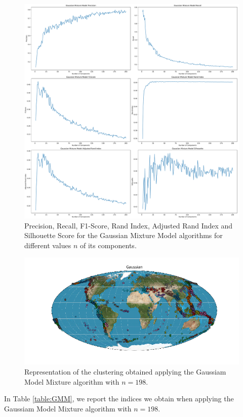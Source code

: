 \documentclass[a4paper]{article}
\begin{document}
 	\begin{figure}[H]
 		\includegraphics[width=\linewidth]{gmm_indeces.pdf}
 		\caption{Precision, Recall, F1-Score, Rand Index, Adjusted Rand Index and Silhouette Score for the Gaussian Mixture Model algorithms for different values $n$ of its components.}
 		\label{fig:gmm}
 	\end{figure}
 	\begin{figure}[H]
 	\includegraphics[width=\linewidth]{Gaussian.png}
 	\caption{Representation of the clustering obtained applying the Gaussiam Model Mixture algorithm with $n= 198$.}
 	\label{fig:gmm_world}
 	\end{figure}

	In Table \ref{table:GMM}, we report the indices we obtain when applying the Gaussiam Model Mixture algorithm with $n= 198$.\\
\end{document}
